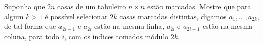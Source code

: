 Suponha que \(2n\) casas de um tabuleiro \(n \times n\) estão marcadas. Mostre que para algum \(k > 1\) é possível selecionar \(2k\) casas marcadas distintas, digamos \(a_1, \dots, a_{2k}\), de tal forma que \(a_{2i-1}\) e \(a_{2i}\) estão na mesma linha, \(a_{2i}\) e \(a_{2i+1}\) estão na mesma coluna, para todo \(i\), com os índices tomados módulo \(2k\).